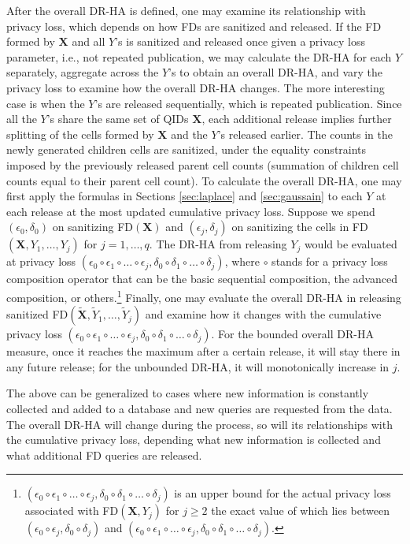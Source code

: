 \documentclass[10pt,journal,compsoc]{IEEEtran}
\newcommand{\X}{\mathbf{X}}
\begin{document}
After the overall DR-HA is defined, one may examine its relationship with privacy loss, which depends on how FDs are sanitized and released.  If the  FD formed by $\X$ and all $Y$'s is sanitized and released once given a privacy loss parameter, i.e., not repeated publication, we may calculate the DR-HA for each $Y$ separately, aggregate across the $Y$'s to obtain an overall DR-HA, and vary the privacy loss to examine how the overall DR-HA changes. The more interesting case is when the $Y$'s are released sequentially, which is repeated publication.  Since all the $Y$'s share the same set of QIDs $\X$, each additional release implies further splitting of the cells formed by $\X$ and the $Y$'s released earlier. The counts in the newly generated children cells are sanitized, under the equality constraints imposed by the previously released  parent cell counts (summation of children cell counts equal to their parent cell count). To calculate the overall DR-HA, one may first apply the formulas  in Sections \ref{sec:laplace} and \ref{sec:gaussain} to each $Y$  at each release at the most updated cumulative privacy loss.  Suppose we spend $(\epsilon_0,\delta_0)$ on sanitizing  FD$(\X)$ and $(\epsilon_j,\delta_j)$ on sanitizing the cells in  FD$(\X,Y_1,\ldots,Y_j)$ for $j\!=\!1,\ldots, q$. The DR-HA from releasing $Y_j$ would be evaluated at privacy loss $(\epsilon_0\circ\epsilon_1\circ\ldots\circ\epsilon_j,\delta_0\circ\delta_1\circ\ldots\circ\delta_j)$, where $\circ$ stands for a privacy loss composition operator that can be the basic sequential composition, the advanced composition, or others.\footnote{$(\epsilon_0\circ\epsilon_1\circ\ldots\circ\epsilon_j,\delta_0\circ\delta_1\circ\ldots\circ\delta_j)$ is an upper bound for the actual privacy loss associated with  FD$(\X,Y_j)$ for $j\ge2$ the exact value of which lies between $(\epsilon_0\circ\epsilon_j,\delta_0\circ\delta_j)$ and $(\epsilon_0\circ\epsilon_1\circ\ldots\circ\epsilon_j, \delta_0\circ\delta_1\circ\ldots\circ\delta_j)$.} Finally, one may evaluate the overall DR-HA in releasing sanitized FD$(\tilde{\X},\tilde{Y}_1,\ldots,\tilde{Y}_j)$ and examine how it changes with the cumulative privacy loss $(\epsilon_0\circ\epsilon_1\circ\ldots\circ\epsilon_j, \delta_0\circ\delta_1\circ\ldots\circ\delta_j)$. For the bounded overall DR-HA measure, once it reaches the maximum after a certain release, it will stay there in any future release; for the unbounded DR-HA, it will monotonically increase in $j$.

The above can be generalized to cases where new information is constantly collected and added to a database and new queries are requested from the data. The overall DR-HA will change during the process, so will its relationships with the cumulative privacy loss,  depending what new information is collected and what additional FD queries are released.
\end{document}

